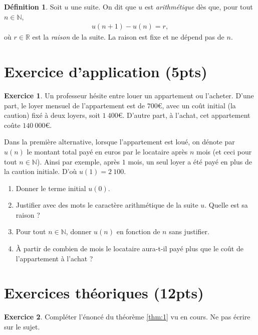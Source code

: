 \documentclass[12pt]{paper}
\theoremstyle{plain}
\theoremstyle{definition}
\newtheorem{ex}{Exercice}
\newtheorem{definition}{Définition}
\newcommand{\R}{\mathbb{R}}
\newcommand{\N}{\mathbb{N}}
\begin{document}
\pagestyle{fancy}
\fancyhead[R]{\today}

\begin{definition}\label{def:1}
	Soit $u$ une suite. On dit que $u$ est \emph{arithmétique} dès que, pour tout $n\in\N$,
		\begin{align}\label{eq:def}
			u(n+1) - u(n) = r,
		\end{align}
	où $r\in\R$ est la \emph{raison} de la suite. La raison est fixe et ne dépend pas de $n$.
\end{definition}
	

\section*{Exercice d'application (5pts)}

\begin{ex}
	Un professeur hésite entre louer un appartement ou l'acheter.
	D'une part, le loyer mensuel de l'appartement est de $700$€, avec un coût initial (la caution) fixé à deux loyers, soit $1\ 400$€.
	D'autre part, à l'achat, cet appartement coûte $140 \ 000$€.
	
	Dans la première alternative, lorsque l'appartement est loué, on dénote par $u(n)$ le montant total payé en euros par le locataire après $n$ mois (et ceci pour tout $n\in\N$).
	Ainsi par exemple, après $1$ mois, un seul loyer a été payé en plus de la caution initiale. D'où $u(1) = 2 \ 100$.
	\begin{enumerate}
		\item Donner le terme initial $u(0)$.
		\item Justifier avec des mots le caractère arithmétique de la suite $u$. Quelle est sa raison ?
		\item Pour tout $n\in\N$, donner $u(n)$ en fonction de $n$ sans justifier.
		\item À partir de combien de mois le locataire aura-t-il payé plus que le coût de l'appartement à l'achat ?
	\end{enumerate}
\end{ex}

\section*{Exercices théoriques (12pts)}

\begin{ex}
	Compléter l'énoncé du théorème \ref{thm:1} vu en cours. Ne pas écrire sur le sujet.
\end{ex}
\end{document}
